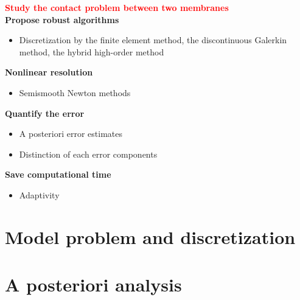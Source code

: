 \documentclass[aspectratio=169]{beamer}
\begin{document}
\begin{frame}
\vspace*{0.1 cm}
\textcolor{red}{\textbf{Study the contact problem between two membranes}}
\\
\vspace{0.3 cm}
\textcolor{cadmiumgreen}{\textbf{Propose robust algorithms}}
\begin{itemize}
\item Discretization by the finite element method, the discontinuous Galerkin method, the hybrid high-order method
\end{itemize}
\textcolor{cadmiumgreen}{\textbf{Nonlinear resolution}}
\begin{itemize}
\item Semismooth Newton methods
  \end{itemize}
\textcolor{cadmiumgreen}{\textbf{Quantify the error}}
\begin{itemize}
  \item A posteriori error estimates
  \item Distinction of each error components
\end{itemize}

\textcolor{cadmiumgreen}{\textbf{Save computational time}}
\begin{itemize}
\item Adaptivity
  \end{itemize}
\end{frame}





\section{Model problem and discretization}
\subsection{}




\section{A posteriori analysis}
\subsection{}
\end{document}

